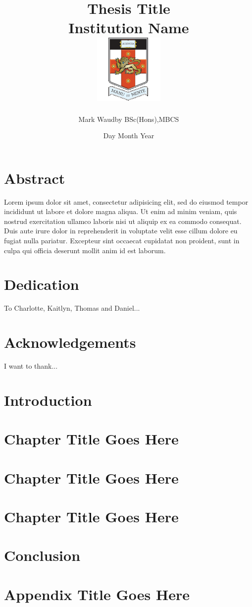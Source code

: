 \documentclass[a4paper,12pt]{report}
\title{
	{Thesis Title}\\
	{\large Institution Name}\\
	{\includegraphics{logo128.png}}
}
\author{Mark Waudby BSc(Hons),MBCS}
\date{Day Month Year}
\begin{document}
\maketitle

\chapter*{Abstract}
Lorem ipsum dolor sit amet, consectetur adipisicing elit, sed do eiusmod
tempor incididunt ut labore et dolore magna aliqua. Ut enim ad minim veniam,
quis nostrud exercitation ullamco laboris nisi ut aliquip ex ea commodo
consequat. Duis aute irure dolor in reprehenderit in voluptate velit esse
cillum dolore eu fugiat nulla pariatur. Excepteur sint occaecat cupidatat non
proident, sunt in culpa qui officia deserunt mollit anim id est laborum.

\chapter*{Dedication}
To Charlotte, Kaitlyn, Thomas and Daniel...

\chapter*{Acknowledgements}
I want to thank...

\tableofcontents

\chapter{Introduction}


\chapter{Chapter Title Goes Here}


\chapter{Chapter Title Goes Here}


\chapter{Chapter Title Goes Here}


\chapter{Conclusion}


\appendix
\chapter{Appendix Title Goes Here}

\end{document}
